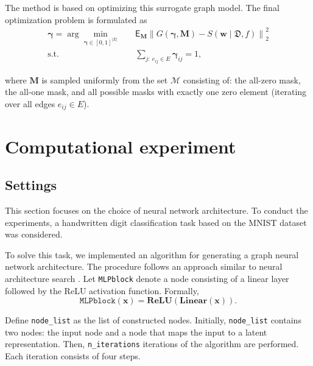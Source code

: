 \documentclass[runningheads]{llncs}
\begin{document}
The method is based on optimizing this surrogate graph model. The final optimization problem is formulated as
\begin{equation}
\begin{aligned}
\boldsymbol{\gamma}
=
\arg\min_{\boldsymbol{\gamma} \in [0,1]^{|E|}}
\quad
& \mathsf{E}_{\mathbf{M}}
\left\|
G(\boldsymbol{\gamma}, \mathbf{M})
-
S(\mathbf{w} \mid \mathfrak{D}, f)
\right\|_2^2
\\
\textrm{s.t.} \quad
&
\sum_{j:\ e_{ij} \in E} \boldsymbol{\gamma}_{ij} = 1,
\end{aligned}
\end{equation}

where $\mathbf{M}$ is sampled uniformly from the set $\mathcal{M}$ consisting of: the all-zero mask, the all-one mask, and all possible masks with exactly one zero element (iterating over all edges $e_{ij} \in E$).

\section{Computational experiment}
\subsection{Settings}

This section focuses on the choice of neural network architecture. 
To conduct the experiments, a handwritten digit classification task based on the MNIST dataset \cite{Deng2012} was considered.

To solve this task, we implemented an algorithm for generating a graph neural network architecture. 
The procedure follows an approach similar to neural architecture search \cite{Zoph2017}. 
Let \texttt{MLPblock} denote a node consisting of a linear layer followed by the ReLU activation function. 
Formally,
\begin{equation}
\texttt{MLPblock}(\mathbf{x}) = \textbf{ReLU}(\textbf{Linear}(\mathbf{x})).
\end{equation}

Define \texttt{node\_list} as the list of constructed nodes. 
Initially, \texttt{node\_list} contains two nodes: the input node and a node that maps the input to a latent representation. 
Then, \texttt{n\_iterations} iterations of the algorithm are performed. 
Each iteration consists of four steps.
\end{document}
